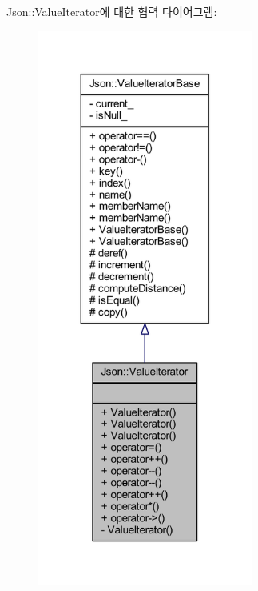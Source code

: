 Json\+:\+:Value\+Iterator에 대한 협력 다이어그램\+:\nopagebreak
\begin{figure}[H]
\begin{center}
\leavevmode
\includegraphics[width=200pt]{class_json_1_1_value_iterator__coll__graph}
\end{center}
\end{figure}
